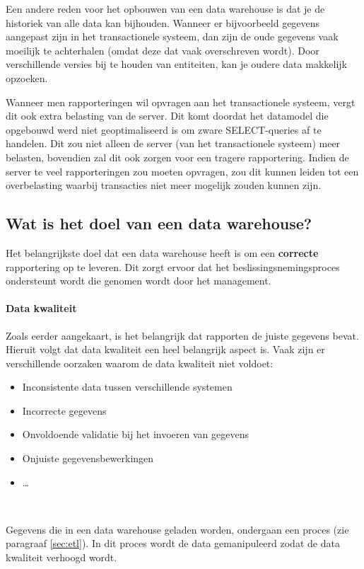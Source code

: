Een andere reden voor het opbouwen van een data warehouse is dat je de historiek van alle data kan bijhouden. Wanneer er bijvoorbeeld gegevens aangepast zijn in het transactionele systeem, dan zijn de oude gegevens vaak moeilijk te achterhalen (omdat deze dat vaak overschreven wordt). Door verschillende versies bij te houden van entiteiten, kan je oudere data makkelijk opzoeken.

Wanneer men rapporteringen wil opvragen aan het transactionele systeem, vergt dit ook extra belasting van de server. Dit komt doordat het datamodel die opgebouwd werd niet geoptimaliseerd is om zware SELECT-queries af te handelen. Dit zou niet alleen de server (van het transactionele systeem) meer belasten, bovendien zal dit ook zorgen voor een tragere rapportering. Indien de server te veel rapporteringen zou moeten opvragen, zou dit kunnen leiden tot een overbelasting waarbij transacties niet meer mogelijk zouden kunnen zijn. 


\subsection{Wat is het doel van een data warehouse?}
Het belangrijkste doel dat een data warehouse heeft is om een \textbf{correcte} rapportering op te leveren. Dit zorgt ervoor dat het beslissingsnemingsproces ondersteunt wordt die genomen wordt door het management. 

\paragraph{Data kwaliteit}
Zoals eerder aangekaart, is het belangrijk dat rapporten de juiste gegevens bevat. Hieruit volgt dat data kwaliteit een heel belangrijk aspect is. Vaak zijn er verschillende oorzaken waarom de data kwaliteit niet voldoet:

\begin{itemize}
	\item Inconsistente data tussen verschillende systemen
	\item Incorrecte gegevens
	\item Onvoldoende validatie bij het invoeren van gegevens
	\item Onjuiste gegevensbewerkingen
	\item \ldots
\end{itemize}  
~\autocite{Helfert2002}

Gegevens die in een data warehouse geladen worden, ondergaan een proces (zie paragraaf \ref{sec:etl}). In dit proces wordt de data gemanipuleerd zodat de data kwaliteit verhoogd wordt.

